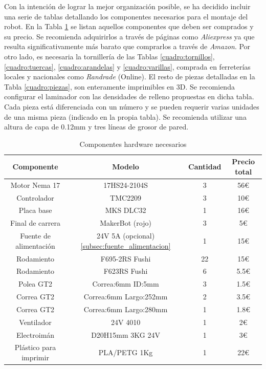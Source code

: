 Con la intención de lograr la mejor organización posible, se ha decidido incluir una serie de tablas 
detallando los componentes necesarios para el montaje del robot. En la Tabla \ref{cuadro:componentes} se listan aquellos 
componentes que deben ser comprados y su precio. Se recomienda adquirirlos a través de páginas como \textit{Aliexpress} ya que 
resulta significativamente más barato que comprarlos a través de \textit{Amazon}. Por otro lado, es necesaria la tornillería 
de las Tablas \ref{cuadro:tornillos}, \ref{cuadro:tuercas}, \ref{cuadro:arandelas} y \ref{cuadro:varillas}, comprada en ferreterías locales y nacionales como \textit{Randrade} (Online). El resto 
de piezas detalladas en la Tabla \ref{cuadro:piezas}, son enteramente imprimibles en 3D. Se recomienda configurar el laminador 
con las densidades de relleno propuestas en dicha tabla. Cada pieza está diferenciada con un número y se pueden requerir varias 
unidades de una misma pieza (indicado en la propia tabla). Se recomienda utilizar una altura de capa de 0.12mm y tres líneas 
de grosor de pared.
\begin{table}[H]
\begin{center}
\begin{tabular}{|c|c|c|c|}
\hline
\textbf{Componente} & \textbf{Modelo} & \textbf{Cantidad} & \textbf{Precio total} \\
\hline
Motor Nema 17 & 17HS24-2104S & 3 & 56\euro \\
Controlador & TMC2209 & 3 & 10\euro \\
Placa base & MKS DLC32 & 1 & 16\euro \\
Final de carrera & MakerBot (rojo) & 3 & 5\euro \\
Fuente de alimentación & 24V 5A (opcional)\ref{subsec:fuente_alimentacion} & 1 & 15\euro \\
Rodamiento &  F695-2RS Fushi & 22 & 15\euro \\
Rodamiento & F623RS Fushi & 6 & 5.5\euro \\
Polea GT2 & Correa:6mm ID:5mm & 3 & 1.5\euro \\
Correa GT2 & Correa:6mm Largo:252mm & 2 & 3.5\euro \\ 
Correa GT2 &  Correa:6mm Largo:280mm & 1 & 1.8\euro \\ 
Ventilador & 24V 4010 & 1 & 2\euro \\
Electroimán & D20H15mm 3KG 24V & 1 & 3\euro \\
Plástico para imprimir & PLA/PETG 1Kg & 1 & 22\euro \\
\hline
\end{tabular}
\caption{Componentes hardware necesarios}
\label{cuadro:componentes}
\end{center}
\end{table}


